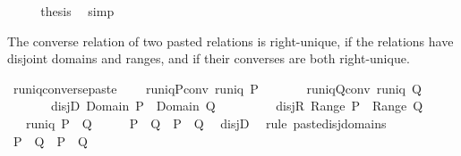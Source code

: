 \begin{isabellebody}
\ \ \isamarkupfalse%
\ \isamarkupfalse%
\ {\isacharquery}thesis\ \isamarkupfalse%
\ simp\isanewline
{}\isamarkupfalse%
%
\endisatagproof
{\isafoldproof}%
%
\isadelimproof
%
\endisadelimproof
%
\begin{isamarkuptext}%
The converse relation of two pasted relations is right-unique, if 
  the relations have disjoint domains and ranges, and if their converses are both
  right-unique.%
\end{isamarkuptext}%
\isamarkuptrue%
\isamarkupfalse%
\ runiq{\isacharunderscore}converse{\isacharunderscore}paste{\isacharcolon}\ \isanewline
\ \ \ runiq{\isacharunderscore}P{\isacharunderscore}conv{\isacharcolon}\ {\isachardoublequoteopen}runiq\ {\isacharparenleft}P{\isasyminverse}{\isacharparenright}{\isachardoublequoteclose}\isanewline
\ \ \ \ \ \ \ runiq{\isacharunderscore}Q{\isacharunderscore}conv{\isacharcolon}\ {\isachardoublequoteopen}runiq\ {\isacharparenleft}Q{\isasyminverse}{\isacharparenright}{\isachardoublequoteclose}\isanewline
\ \ \ \ \ \ \ disj{\isacharunderscore}D{\isacharcolon}\ {\isachardoublequoteopen}Domain\ P\ {\isasyminter}\ Domain\ Q\ {\isacharequal}\ {\isacharbraceleft}{\isacharbraceright}{\isachardoublequoteclose}\isanewline
\ \ \ \ \ \ \ disj{\isacharunderscore}R{\isacharcolon}\ {\isachardoublequoteopen}Range\ P\ {\isasyminter}\ Range\ Q\ {\isacharequal}\ {\isacharbraceleft}{\isacharbraceright}{\isachardoublequoteclose}\isanewline
\ \ \ {\isachardoublequoteopen}runiq\ {\isacharparenleft}{\isacharparenleft}P\ {\isacharplus}{\isacharasterisk}\ Q{\isacharparenright}{\isasyminverse}{\isacharparenright}{\isachardoublequoteclose}\isanewline
%
\isadelimproof
%
\endisadelimproof
%
\isatagproof
{}\isamarkupfalse%
\ {\isacharminus}\isanewline
\ \ \isamarkupfalse%
\ {\isachardoublequoteopen}P\ {\isacharplus}{\isacharasterisk}\ Q\ {\isacharequal}\ P\ {\isasymunion}\ Q{\isachardoublequoteclose}\ \isamarkupfalse%
\ disj{\isacharunderscore}D\ \isamarkupfalse%
\ {\isacharparenleft}rule\ paste{\isacharunderscore}disj{\isacharunderscore}domains{\isacharparenright}\isanewline
\ \ \isamarkupfalse%
\ \isamarkupfalse%
\ {\isachardoublequoteopen}{\isacharparenleft}P\ {\isacharplus}{\isacharasterisk}\ Q{\isacharparenright}{\isasyminverse}\ {\isacharequal}\ P{\isasyminverse}\ {\isasymunion}\ Q{\isasyminverse}{\isachardoublequoteclose}\ \isamarkupfalse%

\end{isabellebody}
